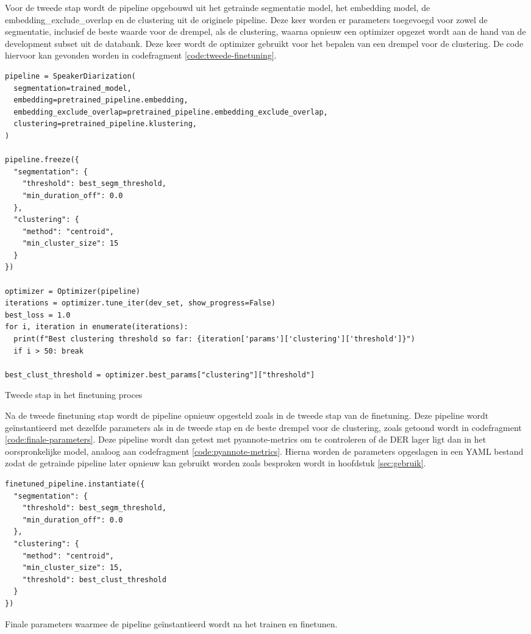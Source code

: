 Voor de tweede stap wordt de pipeline opgebouwd uit het getrainde segmentatie model, het embedding model, de embedding\_exclude\_overlap en de clustering uit de originele pipeline. Deze keer worden er parameters toegevoegd voor zowel de segmentatie, inclusief de beste waarde voor de drempel, als de clustering, waarna opnieuw een optimizer opgezet wordt aan de hand van de development subset uit de databank. Deze keer wordt de optimizer gebruikt voor het bepalen van een drempel voor de clustering. De code hiervoor kan gevonden worden in codefragment \ref{code:tweede-finetuning}.

\begin{listing}
	\begin{verbatim}
pipeline = SpeakerDiarization(
  segmentation=trained_model,
  embedding=pretrained_pipeline.embedding,
  embedding_exclude_overlap=pretrained_pipeline.embedding_exclude_overlap,
  clustering=pretrained_pipeline.klustering,
)

pipeline.freeze({
  "segmentation": {
    "threshold": best_segm_threshold,
    "min_duration_off": 0.0
  },
  "clustering": {
    "method": "centroid",
    "min_cluster_size": 15
  }
})

optimizer = Optimizer(pipeline)
iterations = optimizer.tune_iter(dev_set, show_progress=False)
best_loss = 1.0
for i, iteration in enumerate(iterations):
  print(f"Best clustering threshold so far: {iteration['params']['clustering']['threshold']}")
  if i > 50: break
  
best_clust_threshold = optimizer.best_params["clustering"]["threshold"]
	\end{verbatim}
	\caption[Set-up voor tweede finetuning]{\label{code:tweede-finetuning}Tweede stap in het finetuning proces}
\end{listing}

Na de tweede finetuning stap wordt de pipeline opnieuw opgesteld zoals in de tweede stap van de finetuning. Deze pipeline wordt geïnstantieerd met dezelfde parameters als in de tweede stap en de beste drempel voor de clustering, zoals getoond wordt in codefragment \ref{code:finale-parameters}. Deze pipeline wordt dan getest met pyannote-metrics om te controleren of de DER lager ligt dan in het oorspronkelijke model, analoog aan codefragment \ref{code:pyannote-metrics}. Hierna worden de parameters opgeslagen in een YAML bestand zodat de getrainde pipeline later opnieuw kan gebruikt worden zoals besproken wordt in hoofdstuk \ref{sec:gebruik}.

\begin{listing}
	\begin{verbatim}
finetuned_pipeline.instantiate({
  "segmentation": {
    "threshold": best_segm_threshold,
    "min_duration_off": 0.0
  },
  "clustering": {
    "method": "centroid",
    "min_cluster_size": 15,
    "threshold": best_clust_threshold
  }
})
	\end{verbatim}
	\caption[Finale parameters]{\label{code:finale-parameters}Finale parameters waarmee de pipeline geïnstantieerd wordt na het trainen en finetunen.}
\end{listing}

